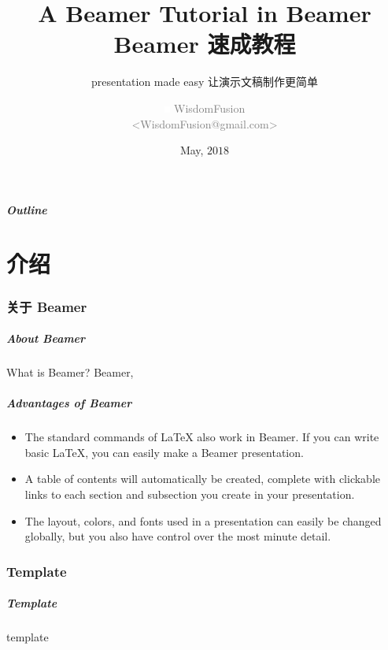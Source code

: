 \documentclass[aspectratio=169,utf8]{ctexbeamer}
\title[Beamer Tutorial]{A Beamer Tutorial in Beamer\\ Beamer 速成教程}
\subtitle{presentation made easy 让演示文稿制作更简单}
\author[WisdomFusion]{
  \includegraphics[width=0.2cm]{figs/GitHub-Mark-Light-120px-plus.png}
  \small \textcolor{gray}{WisdomFusion\\ <WisdomFusion@gmail.com>}
}
\date{May, $2018$}
\begin{document}
\begin{frame}
  \titlepage
\end{frame}

\addtocounter{framenumber}{-1}

\begin{frame}
  \frametitle{Outline}
  \tableofcontents
\end{frame}

\part{介绍}

\section*{关于 Beamer}
\begin{frame}[t]
  \frametitle{About Beamer}

  \begin{block}{What is Beamer?}
    Beamer,
  \end{block}
  
\end{frame}


\begin{frame}
  \frametitle{Advantages of Beamer}

  \begin{itemize}
    \item The standard commands of \LaTeX{} also work in Beamer. If you can write basic \LaTeX{}, you can easily make a Beamer presentation.
    \item A table of contents will automatically be created, complete with clickable links to each section and subsection you create in your presentation.
    \item The layout, colors, and fonts used in a presentation can easily be changed globally, but you also have control over the most minute detail.
  \end{itemize}
  
\end{frame}

\section*{Template}
\begin{frame}
  \frametitle{Template}

  template

\end{frame}
\end{document}

